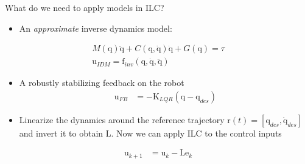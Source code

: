 \documentclass[handout]{beamer}
\newcommand{\boldvec}[1]{\boldsymbol{\mathrm{#1}}}
\let\vec\boldvec
\newcommand{\joint}{\vec{q}} %
\newcommand{\error}{\vec{e}} %
\newcommand{\traj}{\vec{r}} %
\newcommand{\sysInput}{\vec{u}} %
\newcommand{\lmatrix}{\vec{L}} %
\begin{document}
%
%
\begin{frame}{What do we need to apply models in ILC?}
\begin{itemize}
\item An \emph{approximate} inverse dynamics model:
\end{itemize}
\begin{equation*}
\begin{aligned}
M(\joint)\ddot{\joint} + C(\joint,\dot{\joint})\dot{\joint} + G(\joint) = \tau \\
\sysInput_{IDM} = \vec{f}_{inv}(\joint,\dot{\joint},\ddot{\joint})
\end{aligned}
\end{equation*}
\begin{itemize}
\item A robustly stabilizing feedback on the robot
\begin{equation*}
\begin{aligned}
\sysInput_{FB} &= -\vec{K}_{LQR}(\joint - \joint_{des})
\end{aligned}
\end{equation*}
\item Linearize the dynamics around the reference trajectory $\traj(t) = [\joint_{des}, \dot{\joint}_{des}]$ and invert it to obtain $\lmatrix$. Now we can apply ILC to the control inputs
\end{itemize}
\begin{equation*}
\begin{aligned}
\sysInput_{k+1} &= \sysInput_{k} - \lmatrix\error_{k}
\end{aligned}
\end{equation*}
\end{frame}
%
\end{document}
